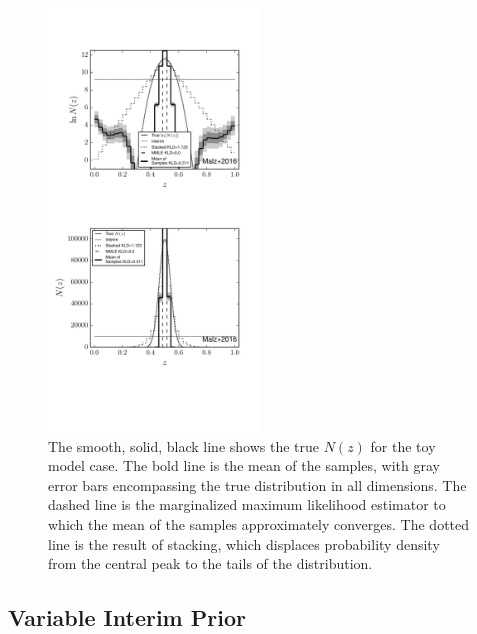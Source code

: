 \documentclass[preprint]{aastex}
\begin{document}
\begin{figure}
\includegraphics[width=0.5\textwidth]{figs/delt/comps.pdf}
\caption{The smooth, solid, black line shows the true $N(z)$ for the toy model 
case.  The bold line is the mean of the samples, with gray error bars 
encompassing the true distribution in all dimensions.  The dashed line is the 
marginalized maximum likelihood estimator to which the mean of the samples 
approximately converges.  The dotted line is the result of stacking, which 
displaces probability density from the central peak to the tails of the 
distribution.}
\label{fig:toy-comp}
\end{figure}

\clearpage
\subsection{Variable Interim Prior}
\label{sec:interim}
\end{document}
